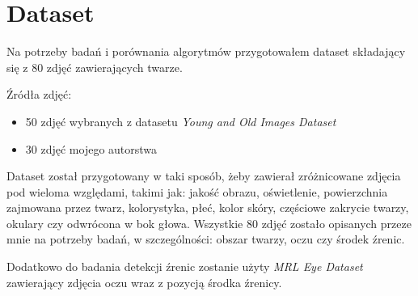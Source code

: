 \newpage 

\section{Dataset}
\label{section:dataset}
Na potrzeby badań i porównania algorytmów przygotowałem dataset składający się z 80 zdjęć zawierających twarze. 
\par
Źródła zdjęć:

\begin{itemize}
    \item 50 zdjęć wybranych z datasetu \textit{Young and Old Images Dataset} \cite{young_old_dataset}
    \item 30 zdjęć mojego autorstwa
\end{itemize}

Dataset został przygotowany w taki sposób, żeby zawierał zróżnicowane zdjęcia pod wieloma względami, takimi jak: jakość obrazu, oświetlenie, powierzchnia zajmowana przez twarz, kolorystyka, płeć, kolor skóry, częściowe zakrycie twarzy, okulary czy odwrócona w bok głowa. 
Wszystkie 80 zdjęć zostało opisanych przeze mnie na potrzeby badań, w szczególności: obszar twarzy, oczu czy środek źrenic. 
\par
Dodatkowo do badania detekcji źrenic zostanie użyty \textit{MRL Eye Dataset} \cite{mrl_eye_dataset} zawierający zdjęcia oczu wraz z pozycją środka źrenicy.